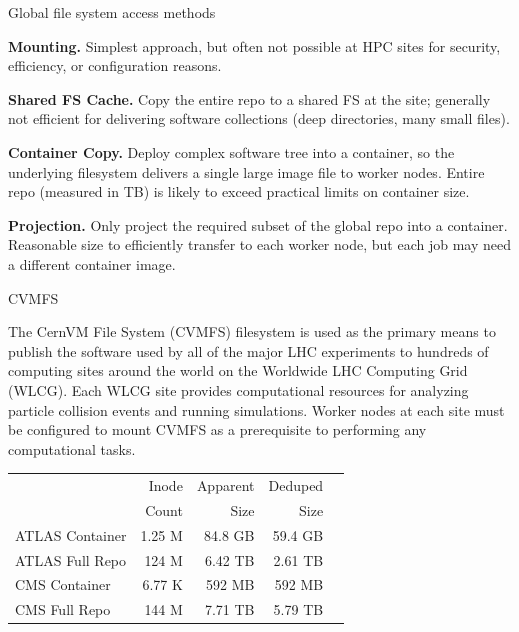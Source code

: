 \documentclass{beamer}
\newenvironment{BlueBlock}[1]
{\begin{alertblock}{#1\rule{0pt}{2.3ex}} \vspace*{16pt}}
{\end{alertblock}}
\begin{document}
\begin{frame}[fragile]
\begin{minipage}[t][0.93\textheight]{0.32\textwidth}
\begin{BlueBlock}{Global file system access methods}
{\textbf{Mounting.}  Simplest approach,
but often not possible at HPC sites
for security, efficiency, or configuration reasons.

\textbf{Shared FS Cache.}
Copy the entire repo to a
shared FS at the site;
generally
not efficient for delivering software collections (deep directories, many small files).
}

\vspace*{0.5ex}

\parbox{\linewidth}{
\textbf{Container Copy.}
Deploy complex software tree into a container,
so the underlying filesystem delivers a single large image file to worker nodes.
Entire repo (measured in TB) is likely to exceed practical limits on container size.

\textbf{Projection.}
Only project the
required subset of the global repo into a container.
Reasonable size to efficiently transfer to each worker node,
but each job may need a different container image.
}
\end{BlueBlock}

\end{minipage}\hfill
\begin{minipage}[t][0.93\textheight]{0.32\textwidth}

\begin{BlueBlock}{CVMFS}
\parbox{\linewidth}{
The CernVM File System (CVMFS) filesystem is used as the primary means to publish the software used by all of the major LHC
experiments to hundreds of computing sites around the world on the Worldwide LHC Computing Grid (WLCG).
Each WLCG site provides computational resources for analyzing particle collision events and running simulations.
Worker nodes at each site must be configured to mount CVMFS as a prerequisite to performing any computational tasks.

\begin{center}
\begin{tabular}{l|r r r r}
& Inode & Apparent & Deduped \\
& Count & Size & Size \\ \hline
ATLAS Container \rule{0pt}{2.3ex} & 1.25 M & 84.8 GB & 59.4 GB \\
ATLAS Full Repo & 124 M & 6.42 TB & 2.61 TB  \\
CMS Container & 6.77 K & 592 MB & 592 MB  \\
CMS Full Repo & 144 M & 7.71 TB & 5.79 TB  \\
\end{tabular}
\end{center}

}
\end{BlueBlock}
\end{minipage}
\end{frame}
\end{document}
